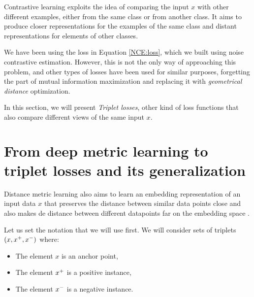 \label{Chapter:connection:triplets}

Contrastive learning exploits the idea of comparing the input $x$ with other different examples, either from the same class or from another class. It aims to produce closer representations for the examples of the same class and distant representations for elements of other classes.

We have been using the loss in Equation \eqref{NCE:loss}, which we built using noise contrastive estimation. However, this is not the only way of approaching this problem, and other types of losses have been used for similar purposes, forgetting the part of mutual information maximization and replacing it with \emph{geometrical distance} optimization.

In this section, we will present \emph{Triplet losses}, other kind of loss functions that also compare different views of the same input $x$.

\section{From deep metric learning to triplet losses and its generalization}

Distance metric learning also aims to learn an embedding representation of an input data $x$ that preserves the distance between similar data points close and also makes de distance between different datapoints far on the embedding space \citep{Sohn2016ImprovedDM}.

Let us set the notation that we will use first. We will consider sets of triplets $(x,x^+,x^-)$ where:
\begin{itemize}
\item The element $x$ is an anchor point,
\item The element $x^+$ is a positive instance,
\item The element $x^-$ is a negative instance.
\end{itemize}

